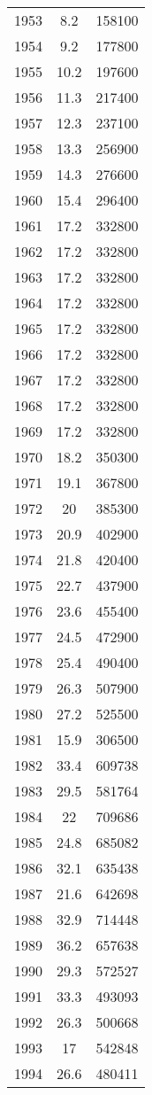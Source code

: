 \documentclass[11pt]{book}
\begin{document}
\begin{longtable}[t]{ccc}
1953 & 8.2 & 158100\\
1954 & 9.2 & 177800\\
1955 & 10.2 & 197600\\
1956 & 11.3 & 217400\\
1957 & 12.3 & 237100\\
1958 & 13.3 & 256900\\
1959 & 14.3 & 276600\\
1960 & 15.4 & 296400\\
1961 & 17.2 & 332800\\
1962 & 17.2 & 332800\\
1963 & 17.2 & 332800\\
1964 & 17.2 & 332800\\
1965 & 17.2 & 332800\\
1966 & 17.2 & 332800\\
1967 & 17.2 & 332800\\
1968 & 17.2 & 332800\\
1969 & 17.2 & 332800\\
1970 & 18.2 & 350300\\
1971 & 19.1 & 367800\\
1972 & 20 & 385300\\
1973 & 20.9 & 402900\\
1974 & 21.8 & 420400\\
1975 & 22.7 & 437900\\
1976 & 23.6 & 455400\\
1977 & 24.5 & 472900\\
1978 & 25.4 & 490400\\
1979 & 26.3 & 507900\\
1980 & 27.2 & 525500\\
1981 & 15.9 & 306500\\
1982 & 33.4 & 609738\\
1983 & 29.5 & 581764\\
1984 & 22 & 709686\\
1985 & 24.8 & 685082\\
1986 & 32.1 & 635438\\
1987 & 21.6 & 642698\\
1988 & 32.9 & 714448\\
1989 & 36.2 & 657638\\
1990 & 29.3 & 572527\\
1991 & 33.3 & 493093\\
1992 & 26.3 & 500668\\
1993 & 17 & 542848\\
1994 & 26.6 & 480411\\

\end{longtable}
\end{document}
